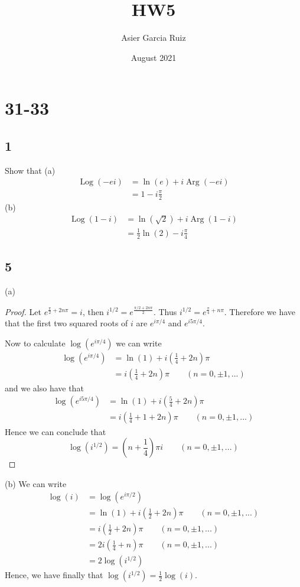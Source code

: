 \documentclass{article}
\title{HW5}
\author{Asier Garcia Ruiz }
\date{August 2021}
\DeclareMathOperator*{\Log}{Log}
\DeclareMathOperator*{\Arg}{Arg}
\begin{document}
\maketitle

\section*{31-33}
\subsection*{1}
Show that
(a)\begin{align*}
    \Log(-ei) & = \ln(e) + i\Arg(-ei) \\
              & = 1 - i\frac{\pi}{2}
\end{align*}
(b) \begin{align*}
    \Log(1 - i) & = \ln(\sqrt{2}) + i\Arg(1 - i)       \\
                & = \frac{1}{2}\ln(2) - i\frac{\pi}{4}
\end{align*}

\subsection*{5}
(a)
\begin{proof}
    Let $e^{\frac{\pi}{2} + 2n\pi} = i$, then $i^{1/2} = e^{\frac{\pi/2 + 2n\pi}{2}}$.
    Thus $i^{1/2} = e^{\frac{\pi}{4} + n\pi}$. Therefore we have that the first two
    squared roots of $i$ are $e^{i\pi/4}$ and $e^{i5\pi/4}$.

    Now to calculate $\log(e^{i\pi/4})$ we can write
    \begin{align*}
        \log(e^{i\pi/4}) & = \ln(1) + i(\frac{1}{4}+2n)\pi                    \\
                         & = i(\frac{1}{4} + 2n)\pi \qquad (n = 0, \pm 1,...)
    \end{align*}
    and we also have that
    \begin{align*}
        \log(e^{i5\pi/4}) & = \ln(1) + i(\frac{5}{4}+2n)\pi                       \\
                          & = i(\frac{1}{4} + 1 + 2n)\pi \qquad (n= 0, \pm 1,...)
    \end{align*}
    Hence we can conclude that
    $$\log(i^{1/2}) = (n + \frac{1}{4})\pi i \qquad (n = 0, \pm 1,...)$$
\end{proof}
(b)
We can write
\begin{align*}
    \log(i) & = \log(e^{i\pi /2})                                         \\
            & = \ln(1) + i(\frac{1}{2} + 2n)\pi \qquad (n = 0, \pm 1,...) \\
            & = i(\frac{1}{2} + 2n)\pi \qquad (n= 0, \pm 1,...)           \\
            & = 2i(\frac{1}{4} + n)\pi \qquad (n = 0, \pm 1,...)          \\
            & = 2 \log(i^{1/2})
\end{align*}
Hence, we have finally that $\log(i^{1/2}) = \frac{1}{2}\log(i)$.
\end{document}
